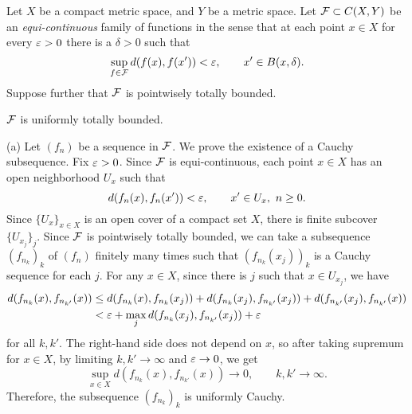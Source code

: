 \documentclass{../../large}
\begin{document}
\begin{prb}
Let $X$ be a compact metric space, and $Y$ be a metric space.
Let $\mathcal{F}\subset C(X,Y)$ be an \emph{equi-continuous} family of functions in the sense that at each point $x\in X$ for every $\varepsilon>0$ there is a $\delta>0$ such that
\[\sup_{f\in\mathcal{F}}d(f(x),f(x'))<\varepsilon,\qquad x'\in B(x,\delta).\]
Suppose further that $\mathcal{F}$ is pointwisely totally bounded.
\begin{parts}
\item $\mathcal{F}$ is uniformly totally bounded.
\end{parts}
\end{prb}
\begin{pf}
(a)
Let $(f_n)$ be a sequence in $\mathcal{F}$.
We prove the existence of a Cauchy subsequence.
Fix $\varepsilon>0$.
Since $\mathcal{F}$ is equi-continuous, each point $x\in X$ has an open neighborhood $U_x$ such that
\[d(f_n(x),f_n(x'))<\varepsilon,\qquad x'\in U_x,\ n\ge0.\]
Since $\{U_x\}_{x\in X}$ is an open cover of a compact set $X$, there is finite subcover $\{U_{x_j}\}_j$.
Since $\mathcal{F}$ is pointwisely totally bounded, we can take a subsequence $(f_{n_k})_k$ of $(f_n)$ finitely many times such that $(f_{n_k}(x_j))_k$ is a Cauchy sequence for each $j$.
For any $x\in X$, since there is $j$ such that $x\in U_{x_j}$, we have
\begin{align*}
d(f_{n_k}(x),f_{n_{k'}}(x))
&\le d(f_{n_k}(x),f_{n_k}(x_j))+d(f_{n_k}(x_j),f_{n_{k'}}(x_j))+d(f_{n_{k'}}(x_j),f_{n_{k'}}(x))\\
&<\varepsilon+\max_jd(f_{n_k}(x_j),f_{n_{k'}}(x_j))+\varepsilon
\end{align*}
for all $k,k'$.
The right-hand side does not depend on $x$, so after taking supremum for $x\in X$, by limiting $k,k'\to\infty$ and $\varepsilon\to0$, we get
\[\sup_{x\in X}d(f_{n_k}(x),f_{n_{k'}}(x))\to0,\qquad k,k'\to\infty.\]
Therefore, the subsequence $(f_{n_k})_k$ is uniformly Cauchy.
\end{pf}
\end{document}
